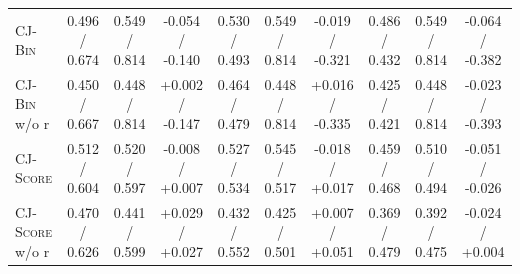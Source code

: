\begin{table}[!t]
\begin{tabular}{@{}l|ccc|ccc|ccc@{}}
        \midrule
        \textsc{CJ-Bin}              & 0.496 / 0.674    & 0.549 / 0.814    & -0.054 / -0.140                              & 0.530 / 0.493    & 0.549 / 0.814    & -0.019 / -0.321                              & 0.486 / 0.432    & 0.549 / 0.814    & -0.064 / -0.382                              \\
        \textsc{CJ-Bin} w/o r        & 0.450 / 0.667    & 0.448 / 0.814    & +0.002 / -0.147                              & 0.464 / 0.479    & 0.448 / 0.814    & +0.016 / -0.335                              & 0.425 / 0.421    & 0.448 / 0.814    & -0.023 / -0.393                              \\
        \midrule
        \textsc{CJ-Score}            & 0.512 / 0.604    & 0.520 / 0.597    & -0.008 / +0.007                              & 0.527 / 0.534    & 0.545 / 0.517    & -0.018 / +0.017                              & 0.459 / 0.468    & 0.510 / 0.494    & -0.051 / -0.026                              \\
        \textsc{CJ-Score} w/o r      & 0.470 / 0.626    & 0.441 / 0.599    & +0.029 / +0.027                              & 0.432 / 0.552    & 0.425 / 0.501    & +0.007 / +0.051                              & 0.369 / 0.479    & 0.392 / 0.475    & -0.024 / +0.004                              \\
        \bottomrule
    \end{tabular}
\end{table}